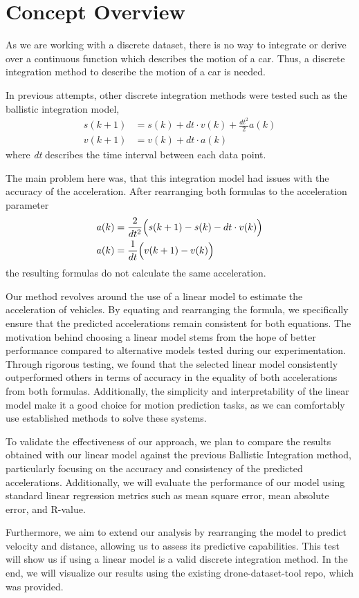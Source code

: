 \section{Concept Overview}
As we are working with a discrete dataset, there is no way to integrate or derive over a continuous function which describes the motion of a car. 
Thus, a discrete integration method to describe the motion of a car is needed. 

In previous attempts, other discrete integration methods were tested such as the ballistic integration model, 
\begin{align}
s(k+1) &= s(k) + dt \cdot v(k) + \frac{dt^2}{2} a(k) \\
v(k+1) &= v(k) + dt \cdot                       a(k)
\end{align}
where \textit{dt} describes the time interval between each data point.

The main problem here was, that this integration model had issues with the accuracy of the acceleration. 
After rearranging both formulas to the acceleration parameter 
\begin{align}
    a(k) &= \frac{2}{dt^2} \Bigl( s(k+1) - s(k) - dt \cdot v(k) \Bigr)\\
    a(k) &= \frac{1}{dt} \Bigl( v(k+1) - v(k) \Bigr)
\end{align}
the resulting formulas do not calculate the same acceleration. 

Our method revolves around the use of a linear model to estimate the acceleration of vehicles.
By equating and rearranging the formula, we specifically ensure that the predicted accelerations remain consistent
for both equations.
The motivation behind choosing a linear model stems from the hope of better performance compared 
to alternative models tested during our experimentation. 
Through rigorous testing, we found that the selected linear model consistently outperformed others in 
terms of accuracy in the equality of both accelerations from both formulas.
Additionally, the simplicity and interpretability of the linear model make it a good choice for 
motion prediction tasks, as we can comfortably use established methods to solve these systems. 

To validate the effectiveness of our approach, we plan to compare the results obtained with our linear 
model against the previous Ballistic Integration method, particularly focusing on the accuracy and consistency of 
the predicted accelerations. 
Additionally, we will evaluate the performance of our model using standard linear regression metrics such as 
mean square error, mean absolute error, and R-value.

Furthermore, we aim to extend our analysis by rearranging the model to predict velocity and distance, 
allowing us to assess its predictive capabilities.
This test will show us if using a linear model is a valid discrete integration method.
In the end, we will visualize our results using the existing drone-dataset-tool repo, 
which was provided.


